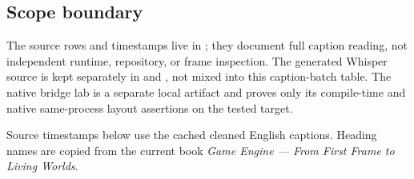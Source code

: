 \subsection{Scope boundary}\label{appendix-877738f6f4d2-scope-boundary}

\hypertarget{appendix-877738f6f4d2-scope-boundary}{}

The source rows and timestamps live in ; they document full caption reading, not independent runtime, repository, or frame inspection. The generated Whisper source  is kept separately in  and , not mixed into this caption-batch table. The native bridge lab is a separate local artifact and proves only its compile-time and native same-process layout assertions on the tested target.

Source timestamps below use the cached cleaned English captions. Heading names are copied from the current book \emph{Game Engine --- From First Frame to Living Worlds}.

